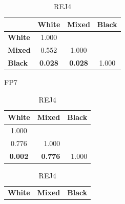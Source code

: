 \begin{table}[H]
    \scriptsize
    \centering
    \setlength\tabcolsep{2pt}
    \begin{subtable}{.275\textwidth}
        \centering
        \begin{tabular}{lccc}
            \toprule
                           & \textbf{White}                         & \textbf{Mixed}                         & \textbf{Black} \\
            \midrule
            \textbf{White} & 1.000                                  &                                        &                \\
            \textbf{Mixed} & 0.552                                  & 1.000                                  &                \\
            \textbf{Black} & \cellcolor[HTML]{EFEFEF}\textbf{0.028} & \cellcolor[HTML]{EFEFEF}\textbf{0.028} & 1.000          \\
            \bottomrule
        \end{tabular}
        \caption{FP7}
    \end{subtable}%
    \begin{subtable}{.21\textwidth}
        \centering
        \begin{tabular}{ccc}
            \toprule
            \multicolumn{1}{l}{\textbf{White}}     & \textbf{Mixed}                                             & \textbf{Black}            \\
            \midrule
            1.000                                  &                                                            &                           \\
            0.776                                  & \multicolumn{1}{r}{1.000}                                  &                           \\
            \cellcolor[HTML]{EFEFEF}\textbf{0.002} & \multicolumn{1}{r}{\cellcolor[HTML]{EFEFEF}\textbf{0.776}} & \multicolumn{1}{r}{1.000} \\
            \bottomrule
        \end{tabular}
        \caption{REJ4}
    \end{subtable}%
    \begin{subtable}{.21\textwidth}
        \centering
        \begin{tabular}{ccc}
            \toprule
            \multicolumn{1}{l}{\textbf{White}}     & \textbf{Mixed}            & \textbf{Black}            \\

\end{tabular}
\end{subtable}
\end{table}

